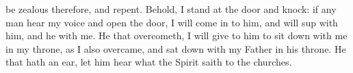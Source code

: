  be zealous therefore, and repent. %
 Behold, I stand at the door and knock:%
 if any man hear my voice and open the door, I will come in to him, and will sup with him, and he with me. %
 He that overcometh, I will give to him to sit down with me in my throne, as I also overcame, and sat down with my Father in his throne. %
 He that hath an ear, let him hear what the Spirit saith to the churches.